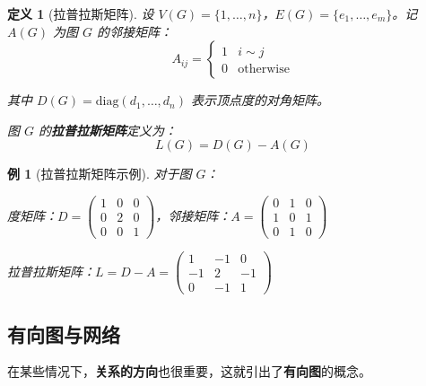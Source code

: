 \documentclass[12pt, a4paper]{article}
\newtheorem{definition}{定义}[section]
\newtheorem{example}{例}[section]
\begin{document}
\begin{definition}[拉普拉斯矩阵]
设 $V(G) = \{1, \dots, n\}$，$E(G) = \{e_1, \dots, e_m\}$。记 $A(G)$ 为图 $G$ 的邻接矩阵：
\[
A_{ij} = \begin{cases}
1 & i \sim j \\
0 & \text{otherwise}
\end{cases}
\]

其中 $D(G) = \text{diag}(d_1, \dots, d_n)$ 表示顶点度的对角矩阵。

图 $G$ 的\textbf{拉普拉斯矩阵}定义为：
\[
L(G) = D(G) - A(G)
\]
\end{definition}

\begin{example}[拉普拉斯矩阵示例]
对于图 $G$：
\begin{center}
\end{center}

度矩阵：$D = \begin{pmatrix} 1 & 0 & 0 \\ 0 & 2 & 0 \\ 0 & 0 & 1 \end{pmatrix}$，邻接矩阵：$A = \begin{pmatrix} 0 & 1 & 0 \\ 1 & 0 & 1 \\ 0 & 1 & 0 \end{pmatrix}$

拉普拉斯矩阵：$L = D - A = \begin{pmatrix} 1 & -1 & 0 \\ -1 & 2 & -1 \\ 0 & -1 & 1 \end{pmatrix}$
\end{example}


\newpage
\subsection{有向图与网络}

在某些情况下，\textbf{关系的方向}也很重要，这就引出了\textbf{有向图}的概念。
\end{document}
